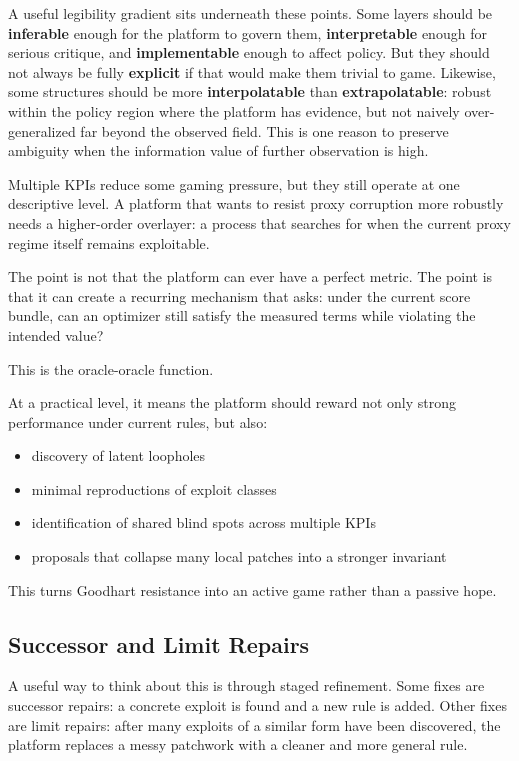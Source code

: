 \documentclass[11pt]{article}
\begin{document}
A useful legibility gradient sits underneath these points. Some layers should be \textbf{inferable} enough for the platform to govern them, \textbf{interpretable} enough for serious critique, and \textbf{implementable} enough to affect policy. But they should not always be fully \textbf{explicit} if that would make them trivial to game. Likewise, some structures should be more \textbf{interpolatable} than \textbf{extrapolatable}: robust within the policy region where the platform has evidence, but not naively over-generalized far beyond the observed field. This is one reason to preserve ambiguity when the information value of further observation is high.

Multiple KPIs reduce some gaming pressure, but they still operate at one descriptive level. A platform that wants to resist proxy corruption more robustly needs a higher-order overlayer: a process that searches for when the current proxy regime itself remains exploitable.

The point is not that the platform can ever have a perfect metric. The point is that it can create a recurring mechanism that asks: under the current score bundle, can an optimizer still satisfy the measured terms while violating the intended value?

This is the oracle-oracle function.

At a practical level, it means the platform should reward not only strong performance under current rules, but also:

\begin{itemize}
  \item discovery of latent loopholes
  \item minimal reproductions of exploit classes
  \item identification of shared blind spots across multiple KPIs
  \item proposals that collapse many local patches into a stronger invariant
\end{itemize}

This turns Goodhart resistance into an active game rather than a passive hope.

\subsection{Successor and Limit Repairs}

A useful way to think about this is through staged refinement. Some fixes are successor repairs: a concrete exploit is found and a new rule is added. Other fixes are limit repairs: after many exploits of a similar form have been discovered, the platform replaces a messy patchwork with a cleaner and more general rule.
\end{document}
